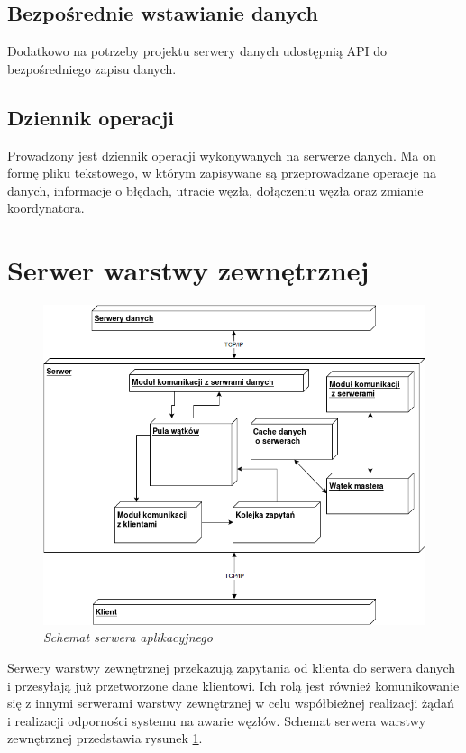 \subsection{Bezpośrednie wstawianie danych}
Dodatkowo na potrzeby projektu serwery danych udostępnią API do bezpośredniego zapisu danych.

\subsection{Dziennik operacji}
Prowadzony jest dziennik operacji wykonywanych na serwerze danych. Ma on formę pliku tekstowego, w którym zapisywane są przeprowadzane operacje na danych, informacje o błędach, utracie węzła, dołączeniu węzła oraz zmianie koordynatora.


\section{Serwer warstwy zewnętrznej}

\begin{figure}[!h]
    \begin{center}
    \includegraphics[angle=0,scale=0.5]{img/ext_serv.png}
    \end{center}
    \caption{\em Schemat serwera aplikacyjnego}
    \label{fig:serv}
\end{figure}

Serwery warstwy zewnętrznej przekazują zapytania od klienta do serwera danych i przesyłają już przetworzone dane klientowi. Ich rolą jest również komunikowanie się z innymi serwerami warstwy zewnętrznej w celu współbieżnej realizacji żądań i realizacji odporności systemu na awarie węzłów. Schemat serwera warstwy zewnętrznej przedstawia rysunek \ref{fig:serv}.

